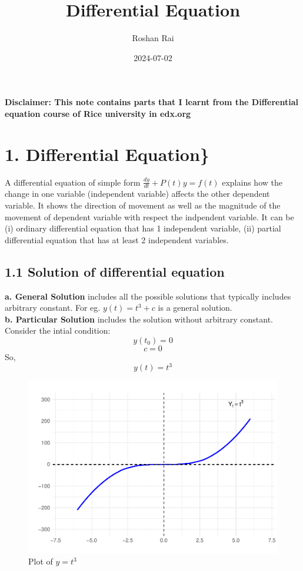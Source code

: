\documentclass[
  11pt,
]{article}
\title{Differential Equation}
\author{Roshan Rai}
\date{2024-07-02}
\begin{document}
\maketitle

\onehalfspacing

\textbf{Disclaimer: This note contains parts that I learnt from the
Differential equation course of Rice university in edx.org}\\

\section{1. Differential Equation\}}\label{differential-equation}

A differential equation of simple form \(\frac{dy}{dt} + P(t)y = f(t)\)
explains how the change in one variable (independent variable) affects
the other dependent variable. It shows the direction of movement as well
as the magnitude of the movement of dependent variable with respect the
indpendent variable. It can be (i) ordinary differential equation that
has 1 independent variable, (ii) partial differential equation that has
at least 2 independent variables.

\subsection{1.1 Solution of differential
equation}\label{solution-of-differential-equation}

\textbf{a. General Solution} includes all the possible solutions that
typically includes arbitrary constant. For eg. \(y(t) = t^3 + c\) is a
general solution.\\
\textbf{b. Particular Solution} includes the solution without arbitrary
constant. Consider the intial condition: \[y(t_0) = 0\] \[c = 0\] So,
\[y(t) = t^3\] \clearpage

\begin{figure}

{\centering \includegraphics{differential_files/figure-latex/difference1-1} 

}

\caption{Plot of $y = t^3$}\label{fig:difference1}
\end{figure}
\end{document}
